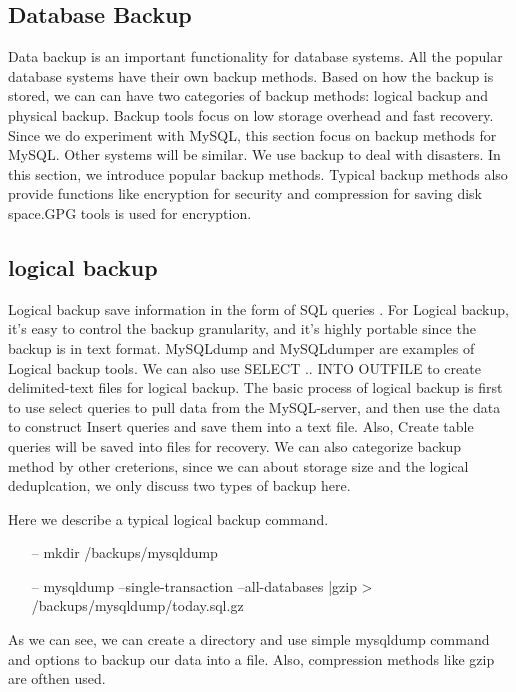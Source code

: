 \subsection{Database Backup}

Data backup is an important functionality for database systems. All the popular database systems have their own backup methods. Based on how the backup is stored, we can can have two categories of backup methods: logical backup and physical backup. Backup tools focus on low storage overhead and fast recovery. Since we do experiment with MySQL, this section focus on backup methods for MySQL. Other systems will be similar. We use backup to deal with disasters. In this section, we introduce popular backup methods. Typical backup methods also provide functions like encryption for security and compression for saving disk space.GPG tools is used for encryption.


\subsection{logical backup}

Logical backup save information in the form of SQL queries \citep{mysqlbackupdocumentatio}. For Logical backup, it's easy to control the backup granularity, and it's highly portable since the backup is in text format. MySQLdump and MySQLdumper\citep{mysqldumpper} are examples of Logical backup tools. We can also use SELECT .. INTO OUTFILE to create delimited-text files for logical backup. The basic process of logical backup is first to use select queries to pull data from the MySQL-server, and then use the data to construct Insert queries and save them into a text file. Also, Create table queries will be saved into files for recovery. We can also categorize backup method by other creterions, since we can about storage size and the logical deduplcation, we only discuss two types of backup here.


Here we describe a typical logical backup command.


\begin{itemize}
\item[--] mkdir /backups/mysqldump
\item[--] mysqldump --single-transaction --all-databases |gzip > /backups/mysqldump/today.sql.gz 
\end{itemize}


                                                 

As we can see, we can create a directory and use simple mysqldump command and options to backup our data into a file. Also, compression methods like gzip are ofthen used.

